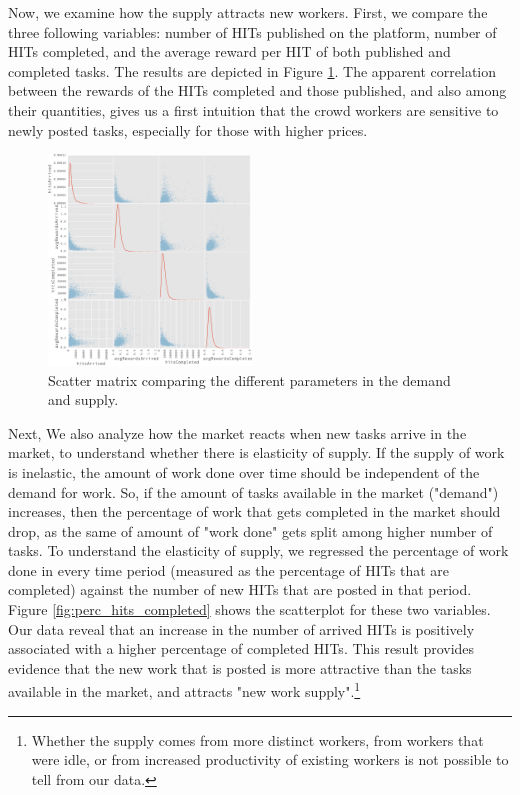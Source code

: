 Now, we examine how the supply attracts new workers. First, we compare the three following variables: number of HITs published on the platform, number of HITs completed, and the average reward per HIT of both published and completed tasks. The results are depicted in Figure \ref{fig:scatter_matrix}. The apparent correlation between the rewards of the HITs completed and those published, and also among their quantities, gives us a first intuition that the crowd workers are sensitive to newly posted tasks, especially for those with higher prices.

\begin{figure}[tb]
	\centering
		\includegraphics[width=0.48\textwidth]{figures/scatter}
	\caption{Scatter matrix comparing the different parameters in the demand and supply.}
	\label{fig:scatter_matrix}
\end{figure}

Next, We also analyze how the market reacts when new tasks arrive in the
market, to understand whether there is elasticity of supply. If the
supply of work is inelastic, the amount of work done over time should
be independent of the demand for work. So, if the amount of tasks
available in the market ("demand") increases, then the percentage of
work that gets completed in the market should drop, as the same of
amount of "work done" gets split among higher number of tasks. To
understand the elasticity of supply, we regressed the percentage of
work done in every time period (measured as the percentage of HITs
that are completed) against the number of new HITs that are posted in
that period. Figure \ref{fig:perc_hits_completed} shows the scatterplot for these two variables.
Our data reveal that an increase in the number of arrived HITs is
positively associated with a higher percentage of completed HITs. This
result provides evidence that the new work that is posted is more
attractive than the tasks available in the market, and attracts "new
work supply".\footnote{Whether the supply comes from more distinct
workers, from workers that were idle, or from increased productivity
of existing workers is not possible to tell from our data.}


